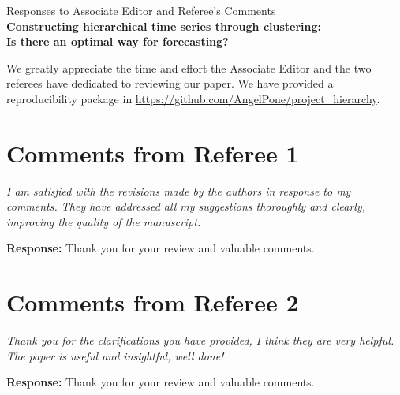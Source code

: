 \documentclass{article}
\numberwithin{equation}{section}
\theoremstyle{plain}
\theoremstyle{definition}
\theoremstyle{remark}
\begin{document}
\begin{center}
\setlength{\unitlength}{2cm}

{\Large Responses to Associate Editor and Referee's Comments \\[%
0pt]
\vspace{0.02in}
\large\textbf{Constructing hierarchical time series through clustering: \\Is there an optimal way for forecasting?}}
\end{center}


\noindent We greatly appreciate the time and effort the Associate Editor and the two referees have dedicated to reviewing our paper. We have provided a reproducibility package in \url{https://github.com/AngelPone/project_hierarchy}.


\newpage


\section*{Comments from Referee 1}

\textit{I am satisfied with the revisions made by the authors in response to my comments. They have addressed all my suggestions thoroughly and clearly, improving the quality of the manuscript.}

\textbf{Response:} Thank you for your review and valuable comments.

\newpage

\section*{Comments from Referee 2}

\textit{Thank you for the clarifications you have provided, I think they are very helpful. The paper is useful and insightful, well done!}

\textbf{Response:} Thank you for your review and valuable comments.
\end{document}
